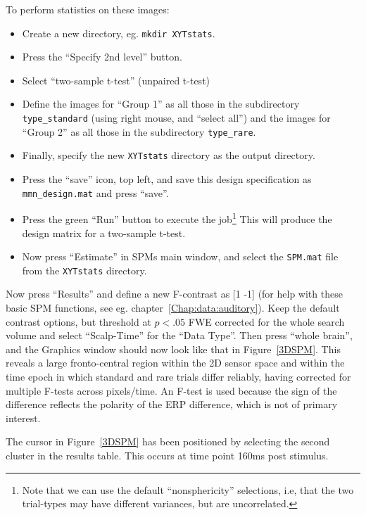 To perform statistics on these images:
\begin{itemize}
\item{Create a new directory, eg. \texttt{mkdir XYTstats}.}
\item{Press the ``Specify 2nd level'' button.}
\item{Select ``two-sample t-test'' (unpaired t-test)}
\item{Define the images for ``Group 1'' as all those in the subdirectory \texttt{type\_standard} (using right mouse, and ``select all'') and the images for ``Group 2'' as all those in the subdirectory \texttt{type\_rare}.}
\item{Finally, specify the new \texttt{XYTstats} directory as the output directory.}
\item{Press the ``save'' icon, top left, and save this design specification as \texttt{mmn\_design.mat} and press ``save''.}
\item{Press the green ``Run'' button to execute the job\footnote{Note that we can use the default ``nonsphericity'' selections, i.e, that the two trial-types may have different variances, but are uncorrelated.} This will produce the design matrix for a two-sample t-test.} 
\item{Now press ``Estimate'' in SPMs main window, and select the \texttt{SPM.mat} file from the \texttt{XYTstats} directory.}
\end{itemize}
Now press ``Results'' and define a new F-contrast as [1 -1] (for help with these basic SPM functions, see eg. chapter~\ref{Chap:data:auditory}). Keep the default contrast options, but threshold at $p<.05$ FWE corrected for the whole search volume and select ``Scalp-Time'' for the ``Data Type''. Then press ``whole brain'', and the Graphics window should now look like that in Figure~\ref{3DSPM}. This reveals a large fronto-central region within the 2D sensor space and within the time epoch in which standard and rare trials differ reliably, having corrected for multiple F-tests across pixels/time. An F-test is used because the sign of the difference reflects the polarity of the ERP difference, which is not of primary interest.
 
The cursor in Figure~\ref{3DSPM} has been positioned by selecting the second cluster in the results table. This occurs at time point 160ms post stimulus.
 

